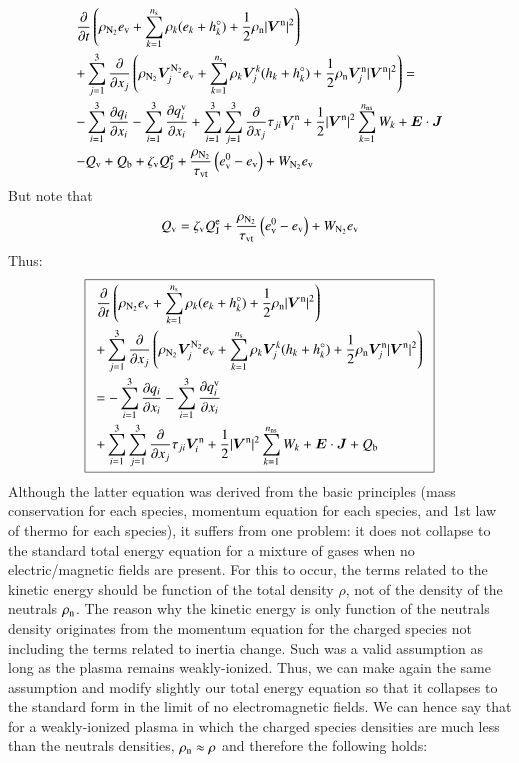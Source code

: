 \documentclass{warpdoc}
\newcommand\frameeqn[1]{\fbox{$\displaystyle #1$}}
\newcommand{\alb}{\vspace{0.1cm}\\} %
\newcommand{\mfd}{\displaystyle}
\newcommand{\ns}{{n_{\rm s}}}
\newcommand{\nns}{{n_{\rm ns}}}
\newcommand{\ev}{{e_{\rm v}}}
\newcommand{\evzero}{{e_{\rm v}^0}}
\newcommand{\tauvt}{\tau_{\rm vt}}
\renewcommand{\vec}[1]{\bm{#1}}
\begin{document}
\begin{equation}
\begin{array}{l}\mfd
 \frac{\partial }{\partial t}\left(\rho_{\rm N_2} \ev+\sum_{k=1}^\ns \rho_k (e_k+h_k^\circ)+\frac{1}{2}\rho_{\rm n}|\vec{V}^{\rm n}|^2 \right)\alb\mfd 
+ \sum_{j=1}^3  \frac{\partial }{\partial x_j} \left(\rho_{\rm N_2} \vec{V}_j^{\rm N_2} \ev + \sum_{k=1}^\ns \rho_k \vec{V}^k_j (h_k+h_k^\circ)+\frac{1}{2}\rho_{\rm n}\vec{V}^{\rm n}_j|\vec{V}^{\rm n}|^2 \right)
= \alb\mfd
-\sum_{i=1}^{3}\frac{\partial q_i}{\partial x_i}
-\sum_{i=1}^{3}\frac{\partial q_i^{\rm v}}{\partial x_i}
+\sum_{i=1}^3 \sum_{j=1}^3  \frac{\partial }{\partial x_j} \tau_{ji} \vec{V}_i^{\rm n}
+\frac{1}{2}|\vec{V}^{\rm n}|^2 \sum_{k=1}^\nns W_k
+ \vec{E}\cdot\vec{J}
\alb\mfd
-  Q_{\rm v}
+ Q_{\rm b}
+ \zeta_{\rm v} Q_{\rm J}^{\rm e}   
+ {\frac{\rho_{\rm N_2}}{\tauvt}}\left( \evzero-\ev \right) + W_{\rm N_2} \ev
\end{array}
\end{equation}
%  
But note that
%
\begin{equation}
Q_{\rm v}= \zeta_{\rm v}Q_{\rm J}^{\rm e}+ {\frac{\rho_{\rm N_2}}{\tauvt}}\left( \evzero-\ev \right) + W_{\rm N_2} \ev
\end{equation}
%
Thus:
%
\begin{equation}
\frameeqn{
\begin{array}{l}\mfd
 \frac{\partial }{\partial t}\left(\rho_{\rm N_2} \ev+\sum_{k=1}^\ns \rho_k (e_k+h_k^\circ)+\frac{1}{2}\rho_{\rm n}|\vec{V}^{\rm n}|^2 \right) \alb\mfd
+ \sum_{j=1}^3  \frac{\partial }{\partial x_j} \left(\rho_{\rm N_2} \vec{V}_j^{\rm N_2} \ev + \sum_{k=1}^\ns \rho_k \vec{V}^k_j (h_k+h_k^\circ)+\frac{1}{2}\rho_{\rm n}\vec{V}^{\rm n}_j|\vec{V}^{\rm n}|^2 \right)
 \alb\mfd
=
-\sum_{i=1}^{3}\frac{\partial q_i}{\partial x_i}
-\sum_{i=1}^{3}\frac{\partial q_i^{\rm v}}{\partial x_i}\alb\mfd
+\sum_{i=1}^3 \sum_{j=1}^3  \frac{\partial }{\partial x_j} \tau_{ji} \vec{V}_i^{\rm n}
+\frac{1}{2}|\vec{V}^{\rm n}|^2 \sum_{k=1}^\nns W_k
+ \vec{E}\cdot\vec{J}
+ Q_{\rm b}
\end{array}
}
\label{eqn:etotal1}
\end{equation}
%  
Although the latter equation was derived from the basic principles (mass conservation for each species, momentum equation for each species, and 1st law of thermo for each species), it suffers from one problem: it does not collapse to the standard total energy equation for a mixture of gases when no electric/magnetic fields are present. For this to occur, the terms related to the kinetic energy should be function of the total density $\rho$, not of the density of the neutrals $\rho_{\rm n}$. The reason why the kinetic energy is only function of the neutrals density originates from the momentum equation for the charged species not including the terms related to inertia change. Such was a valid assumption as long as the plasma remains weakly-ionized. Thus, we can make again the same assumption and modify slightly our total energy equation so that it collapses to the standard form in the limit of no electromagnetic fields. We can hence say that for a weakly-ionized plasma in which the charged species densities are much less than the neutrals densities, $\rho_{\rm n}\approx \rho$ and therefore the following holds:
\end{document}
